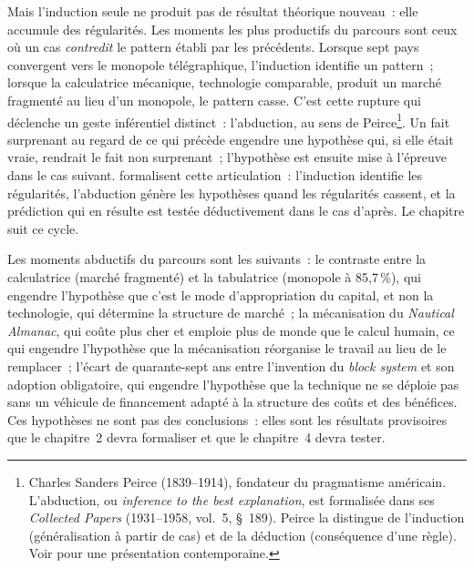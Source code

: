 Mais l'induction seule ne produit pas de résultat théorique nouveau~: elle accumule des régularités. Les moments les plus productifs du parcours sont ceux où un cas \emph{contredit} le pattern établi par les précédents. Lorsque sept pays convergent vers le monopole télégraphique, l'induction identifie un pattern~; lorsque la calculatrice mécanique, technologie comparable, produit un marché fragmenté au lieu d'un monopole, le pattern casse. C'est cette rupture qui déclenche un geste inférentiel distinct~: l'abduction, au sens de Peirce\footnote{Charles Sanders Peirce (1839--1914), fondateur du pragmatisme américain. L'abduction, ou \emph{inference to the best explanation}, est formalisée dans ses \emph{Collected Papers} (1931--1958, vol.~5, §~189). Peirce la distingue de l'induction (généralisation à partir de cas) et de la déduction (conséquence d'une règle). Voir \textcite{douven_abduction_2021} pour une présentation contemporaine.}. Un fait surprenant au regard de ce qui précède engendre une hypothèse qui, si elle était vraie, rendrait le fait non surprenant~; l'hypothèse est ensuite mise à l'épreuve dans le cas suivant. \textcite{timmermans_theory_2012} formalisent cette articulation~: l'induction identifie les régularités, l'abduction génère les hypothèses quand les régularités cassent, et la prédiction qui en résulte est testée déductivement dans le cas d'après. Le chapitre suit ce cycle.

Les moments abductifs du parcours sont les suivants~: le contraste entre la calculatrice (marché fragmenté) et la tabulatrice (monopole à 85,7\,\%), qui engendre l'hypothèse que c'est le mode d'appropriation du capital, et non la technologie, qui détermine la structure de marché~; la mécanisation du \emph{Nautical Almanac}, qui coûte plus cher et emploie plus de monde que le calcul humain, ce qui engendre l'hypothèse que la mécanisation réorganise le travail au lieu de le remplacer~; l'écart de quarante-sept ans entre l'invention du \emph{block system} et son adoption obligatoire, qui engendre l'hypothèse que la technique ne se déploie pas sans un véhicule de financement adapté à la structure des coûts et des bénéfices. Ces hypothèses ne sont pas des conclusions~: elles sont les résultats provisoires que le chapitre~2 devra formaliser et que le chapitre~4 devra tester.


